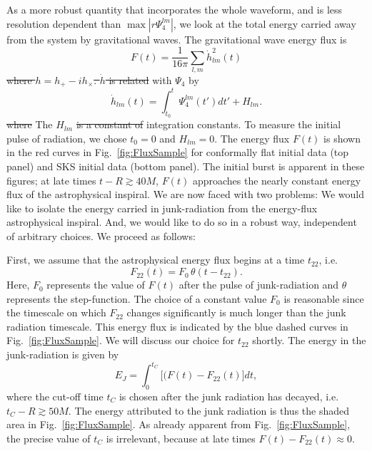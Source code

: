 \documentclass[aps,prd,amsmath,floatfix,twocolumn,superscriptaddress,nofootinbib,showpacs]{revtex4-1}
\theoremstyle{plain}
\theoremstyle{definition}
\newcommand{\harald}[1]{\textcolor{OliveGreen}{#1}}
\begin{document}
As a more robust quantity that incorporates the whole waveform, and is
less resolution dependent than $\max{|r\Psi_4^{lm}|}$, we look at the
total energy carried away from the system by gravitational waves. The
 gravitational wave energy flux is~\cite{Boyle:2008}
\begin{equation}
F(t) =\frac{1}{16\pi}\sum_{l,m}\dot{h}_{lm}^2(t)
\end{equation}
\harald{\sout{where $h=h_{+}-ih_{\times}$. $\dot{h}$ is related} with}
$\Psi_4$ by
\begin{equation}
\dot{h}_{lm}(t)=\int_{t_0}^{t}{\Psi_4^{lm}(t')dt'} + H_{lm}.
\end{equation}
\harald{\sout{where}} The $H_{lm}$  \harald{\sout{is a constant of}} integration \harald{constants}.  To measure the
  initial pulse of radiation, we chose $t_0=0$ and $H_{lm}=0$.  The energy flux $F(t)$ is shown in
the red curves in Fig.~\ref{fig:FluxSample} for conformally flat initial data (top
panel) and SKS initial data (bottom panel).  The initial burst
  is apparent in these figures; at late times $t-R\gtrsim 40M$, $F(t)$
  approaches the nearly constant energy flux of the astrophysical
  inspiral.  We are now faced with two problems: We would like to
  isolate the energy carried in junk-radiation from the energy-flux
  astrophysical inspiral.  And, we would like to do so in a robust way, 
independent of arbitrary choices.  We
  proceed as follows:

  First, we assume that the astrophysical energy flux begins at a time
  $t_{22}$, i.e.
\begin{equation}
  F_{22}(t) = F_0\,\theta(t-t_{22}).
\end{equation}
Here, $F_0$ represents the value of $F(t)$ after the pulse of
junk-radiation and $\theta$ represents the step-function.
The choice of a constant value $F_0$ is reasonable since the
timescale on which $F_{22}$ changes significantly is much longer than
the junk radiation timescale.  This energy flux is indicated by the blue dashed curves in Fig.~\ref{fig:FluxSample}.
We will
discuss our choice for $t_{22}$ shortly.  The energy in the
junk-radiation is given by
\begin{equation}\label{eq:EJ}
E_J=\int_0^{t_C}\big[(F(t)-F_{22}(t)\big]dt,
\end{equation}
where the cut-off time $t_C$ is chosen after the junk radiation has
decayed, i.e. $t_C-R\gtrsim 50M$.  The energy attributed to the junk
radiation is thus the shaded area in Fig.~\ref{fig:FluxSample}.  As
already apparent from Fig.~\ref{fig:FluxSample}, the precise value of
$t_C$ is irrelevant, because at late times $F(t)-F_{22}(t)\approx 0$.  
\end{document}
